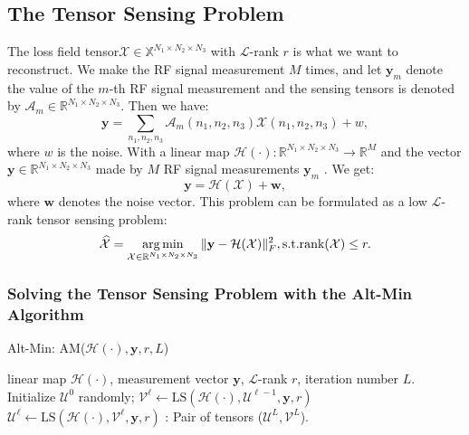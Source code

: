 \documentclass[futureinternet,article,submit,moreauthors,pdftex,10pt,a4paper]{Definitions/mdpi}
\theoremstyle{plain}
\theoremstyle{definition}
\theoremstyle{remark}
\begin{document}
\subsection{The Tensor Sensing Problem}

The loss field tensor$\mathcal{X} \in \mathbb{X}^{N_1 \times N_2 \times N_3}$ with $\mathcal{L}$-rank $r$ is what we want to reconstruct. We make the RF signal measurement $M$ times, and let $\mathbf{y}_m$ denote the value of the $m$-th RF signal measurement and the sensing tensors is denoted by $\mathcal{A}_m \in \mathbb{R}^{N_1 \times N_2 \times N_3}$. Then we have:
\begin{equation}
    \mathbf{y} = \sum\limits_{{n_1,n_2,n_3}}\mathcal{A}_m(n_1,n_2,n_3)\mathcal{X}(n_1, n_2, n_3)+w,
\end{equation}
where $w$ is the noise.
With a linear map $\mathcal{H}(\cdot):\mathbb{R}^{N_1 \times N_2 \times N_3} \to \mathbb{R}^M$\cite{jain2013low} and the vector $\mathbf{y} \in \mathbb{R}^{N_1 \times N_2 \times N_3}$ made by $M$ RF signal measurements $\mathbf{y}_m$ \cite{kong2014data}. We get:
\begin{equation}
    \mathbf{y} = \mathcal{H}(\mathcal{X}) + \mathbf{w},
\end{equation}
where $\mathbf{w}$ denotes the noise vector. This problem can be formulated as a low $\mathcal{L}$-rank tensor sensing problem:
\begin{equation}
    \label{eqa:lstm}
    \widehat{\mathcal{X}} = \mathop{\arg\min}_{\mathcal{X} \in \mathbb{R}^{N_1 \times N_2 \times N_3}}  \| \mathbf{y} - \mathcal{H}(\mathcal{X}) \|_F^2 , \\ 
    \text{s.t.} \text{rank}(\mathcal{X}) \leq r .
\end{equation}

\subsubsection{Solving the Tensor Sensing Problem with the Alt-Min Algorithm}
\begin{algorithm}[htb]
    \caption{Alt-Min: AM($\mathcal{H}(\cdot), \mathbf{y}, r, L$)}
    \label{alg:AM}
    \begin{algorithmic}[1]
        \Require
        linear map $\mathcal{H}(\cdot)$, measurement vector $\mathbf{y}$, $\mathcal{L}$-rank $r$, iteration number $L$.
        \State Initialize $\mathcal{U}^0$ randomly;
            \State $\mathcal{V}^{\ell} \gets \text{LS}(\mathcal{H}(\cdot), \mathcal{U}^{\ell -1}, \mathbf{y}, r)$
            \State $\mathcal{U}^{\ell} \gets \text{LS}(\mathcal{H}(\cdot), \mathcal{V}^{\ell}, \mathbf{y}, r)$
            \EndFor
        \Ensure: Pair of tensors ($\mathcal{U}^L, \mathcal{V}^L$).
    \end{algorithmic}
\end{algorithm}
\end{document}
